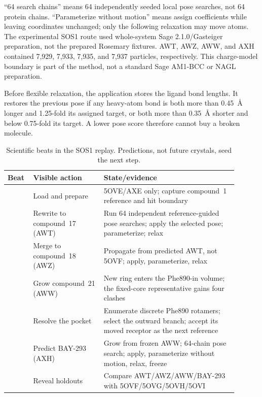 ``64 search chains'' means 64 independently seeded local pose searches, not 64
protein chains. ``Parameterize without motion'' means assign coefficients while
leaving coordinates unchanged; only the following relaxation may move atoms.
The experimental SOS1 route used whole-system Sage 2.1.0/Gasteiger preparation,
not the prepared Rosemary fixtures. AWT, AWZ, AWW, and AXH contained 7,929,
7,933, 7,935, and 7,937 particles, respectively. This charge-model boundary is
part of the method, not a standard Sage AM1-BCC or NAGL preparation.

Before flexible relaxation, the application stores the ligand bond lengths. It
restores the previous pose if any heavy-atom bond is both more than 0.45~\AA{}
longer and 1.25-fold its assigned target, or both more than 0.35~\AA{} shorter
and below 0.75-fold its target. A lower pose score therefore cannot buy a broken
molecule.

\begin{table}[htbp]
  \centering
  \caption{Scientific beats in the SOS1 replay. Predictions, not future
  crystals, seed the next step.}
  \label{tab:sos1-replay}
  \footnotesize
  \renewcommand{\arraystretch}{1.08}
  \begin{tabular}{@{}>{\raggedright\arraybackslash}p{0.08\linewidth}
                       >{\raggedright\arraybackslash}p{0.29\linewidth}
                       >{\raggedright\arraybackslash}p{0.53\linewidth}@{}}
    \toprule
    Beat & Visible action & State/evidence \\
    \midrule
    0 & Load and prepare & 5OVE/AXE only; capture compound~1 reference and hit
      boundary \\
    1 & Rewrite to compound~17 (AWT) & Run 64 independent reference-guided pose
      searches; apply the selected pose; parameterize; relax \\
    2 & Merge to compound~18 (AWZ) & Propagate from predicted AWT, not 5OVF;
      apply, parameterize, relax \\
    3 & Grow compound~21 (AWW) & New ring enters the Phe890-in volume; the
      fixed-core representative gains four clashes \\
    4 & Resolve the pocket & Enumerate discrete Phe890 rotamers; select the
      outward branch; accept its moved receptor as the next reference \\
    5 & Predict BAY-293 (AXH) & Grow from frozen AWW; 64-chain pose search; apply,
      parameterize without motion, relax, freeze \\
    6 & Reveal holdouts & Compare AWT/AWZ/AWW/BAY-293 with
      5OVF/5OVG/5OVH/5OVI \\
    \bottomrule
  \end{tabular}
\end{table}
\FloatBarrier

